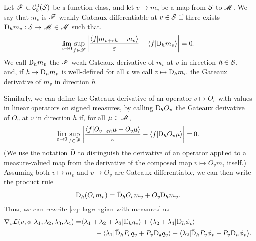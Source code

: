 \documentclass[twoside,10pt]{../jmlr}
\begin{document}
\begin{definition}
    Let $\mathscr{F}\subset \mathcal{C}^0_b(\mathcal{S})$ be a function class, and let $v\mapsto m_v$ be a map from $\mathcal{S}$ to $\mathscr{M}$. We say that $m_v$ is $\mathscr{F}$-weakly Gateaux differentiable at $v\in\mathcal{S}$ if there exists $\mathrm{D}_h m_v:\mathcal{S}\to \mathscr{M}\in\mathscr{M}$ such that, 
    \begin{align}
        \lim_{\varepsilon\to 0} \sup_{f\in\mathscr{F}}\left|\frac{\langle f\vert m_{v+\varepsilon h}-m_v\rangle}{\varepsilon}-\langle f\vert \mathrm{D}_h m_v\rangle\right|=0.
    \end{align}
    We call $\mathrm{D}_h m_v$ the $\mathscr{F}$-weak Gateaux derivative of $m_v$ at $v$ in direction $h\in\mathcal{S}$, and, if $h\mapsto \mathrm{D}_h m_v$ is well-defined for all $v$ we call $v\mapsto \mathrm{D}_h m_v$ the Gateaux derivative of $m_v$ in direction $h$.
\end{definition}

Similarly, we can define the Gateaux derivative of an operator $v\mapsto O_v$ with values in linear operators on signed measures, by calling $\bar{\mathrm{D}}_h O_v$ the Gateaux derivative of $O_v$ at $v$ in direction $h$ if, for all $\mu\in\mathscr{M}$,
\begin{align}
    \lim_{\varepsilon\to 0} \sup_{f\in\mathscr{F}}\left|\frac{\langle f\vert O_{v+\varepsilon h}\mu-O_v\mu\rangle}{\varepsilon}-\langle f\vert \bar{\mathrm{D}}_h O_v\mu\rangle\right|=0.
\end{align}
(We use the notation $\bar{\mathrm{D}}$ to distinguish the derivative of an operator applied to a measure-valued map from the derivative of the composed map $v\mapsto O_v m_v$ itself.)
Assuming both $v\mapsto m_v$ and $v\mapsto O_v$ are Gateaux differentiable, we can then write the product rule
\begin{align}
    \mathrm{D}_h (O_v m_v)=\bar{\mathrm{D}}_h O_v m_v+O_v \mathrm{D}_h m_v. \label{eq: product rule for operator and measure}
\end{align}
Thus, we can rewrite \eqref{eq: lagrangian with measures} as
\begin{align}
    \nabla_v \mathcal{L}(v,\phi,\lambda_1,\lambda_2,\lambda_3,\lambda_4)=&\langle \lambda_1+\lambda_2+\lambda_3\vert \mathrm{D}_h q_v\rangle+ \langle \lambda_2+\lambda_4\vert \mathrm{D}_h \phi_v\rangle\notag\\
    &\qquad-\langle \lambda_1 \vert \bar{\mathrm{D}}_h P_v q_v+ P_v \mathrm{D}_h q_v\rangle -\langle \lambda_2 \vert \bar{\mathrm{D}}_h P_v \phi_v+ P_v \mathrm{D}_h \phi_v\rangle. \label{eq: lagrangian gradient with measures}
\end{align}
\end{document}
